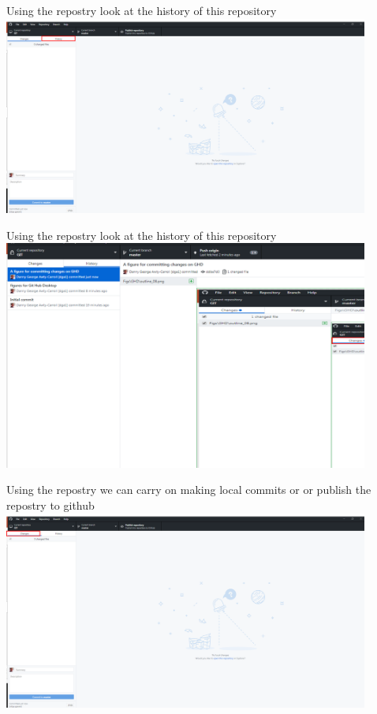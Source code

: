 \documentclass[10pt]{beamer}
\begin{document}
\begin{frame}[fragile]{Using the repostry}
	\small look at the history of this repository
	\includegraphics[width=12cm]{Figs/GHD/outline_06}
\end{frame}

\begin{frame}[fragile]{Using the repostry}
	\small look at the history of this repository
	\includegraphics[width=12cm]{Figs/GHD/hist_00}
\end{frame}


\begin{frame}[fragile]{Using the repostry}
	\small we can carry on making local commits or or publish the repostry to github
	\includegraphics[width=12cm]{Figs/GHD/outline_07}
\end{frame}
\end{document}
